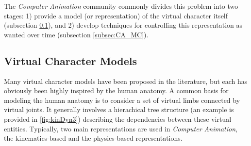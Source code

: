 The \emph{Computer Animation} community commonly divides this problem into two stages: 1) provide a model (or representation) of the virtual character itself (subsection \ref{subsec:CA_VCM}), and 2) develop techniques for controlling this representation as wanted over time (subsection \ref{subsec:CA_MC}).


		\subsection{Virtual Character Models}
		\label{subsec:CA_VCM}
		
Many virtual character models have been proposed in the literature, but each has obviously been highly inspired by the human anatomy. A common basis for modeling the human anatomy is to consider a set of virtual limbs connected by virtual joints. It generally involves a hierachical tree structure (an example is provided in \myfigname \ref{fig:kinDyn3}) describing the dependencies between these virtual entities. Typically, two main representations are used in \emph{Computer Animation}, the kinematics-based and the physics-based representations.


